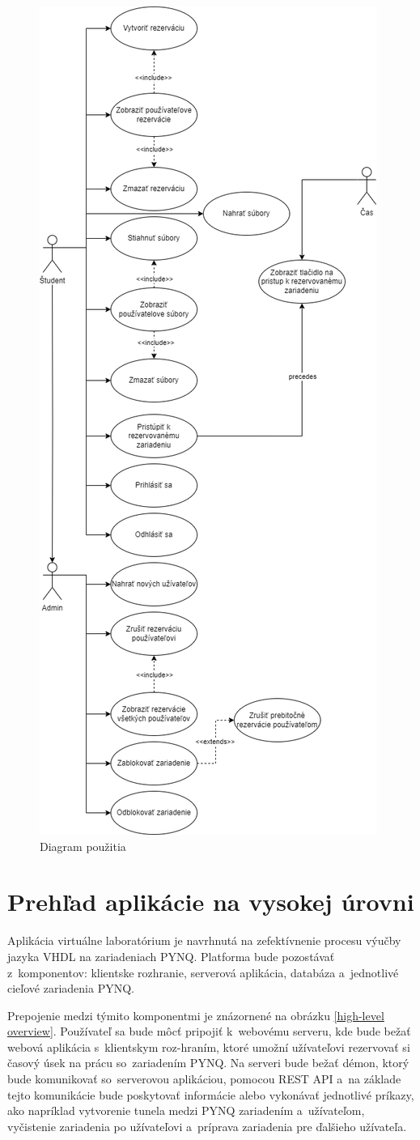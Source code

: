 \begin{figure} \label{use case diagram}
    \centering
    \includegraphics[width=0.55\linewidth]{obrazky-figures/Use_case_diagram.png}

    \caption{Diagram použitia}
\end{figure}

\section{Prehľad aplikácie na vysokej úrovni}

Aplikácia virtuálne laboratórium je navrhnutá na zefektívnenie procesu výučby jazyka VHDL na zariadeniach PYNQ. Platforma bude pozostávať z~komponentov: klientske rozhranie, serverová aplikácia, databáza a~jednotlivé cieľové zariadenia PYNQ.

Prepojenie medzi týmito komponentmi je znázornené na obrázku \ref{high-level overview}. Používateľ sa bude môcť pripojiť k~webovému serveru, kde bude bežať webová aplikácia s~klientskym roz-hraním, ktoré umožní užívateľovi rezervovať si časový úsek na prácu so~zariadením PYNQ. Na serveri bude bežať démon, ktorý bude komunikovať so~serverovou aplikáciou, pomocou REST API a~na základe tejto komunikácie bude poskytovať informácie alebo vykonávať jednotlivé príkazy, ako napríklad vytvorenie tunela medzi PYNQ zariadením a~užívateľom, vyčistenie zariadenia po užívateľovi a~príprava zariadenia pre ďalšieho užívateľa.

